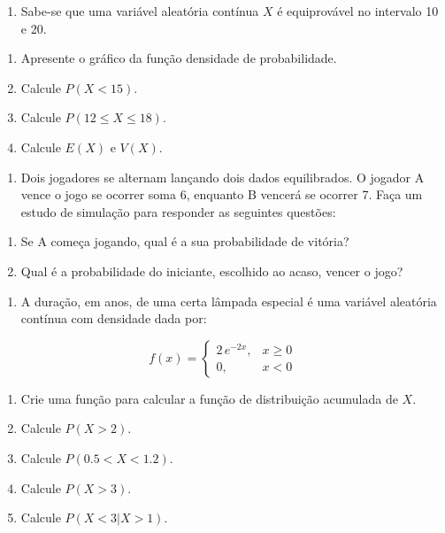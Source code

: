 \documentclass[
]{book}
\providecommand{\tightlist}{%
  \setlength{\itemsep}{0pt}\setlength{\parskip}{0pt}}
\begin{document}
\begin{enumerate}
\def\labelenumi{\arabic{enumi}.}
\setcounter{enumi}{1}
\tightlist
\item
  Sabe-se que uma variável aleatória contínua \(X\) é equiprovável no intervalo 10 e 20.
\end{enumerate}

\begin{enumerate}
\def\labelenumi{(\alph{enumi})}
\tightlist
\item
  Apresente o gráfico da função densidade de probabilidade.
\item
  Calcule \(P(X < 15)\).
\item
  Calcule \(P(12\leq X \leq 18)\).
\item
  Calcule \(E(X)\) e \(V(X)\).
\end{enumerate}

\begin{enumerate}
\def\labelenumi{\arabic{enumi}.}
\setcounter{enumi}{2}
\tightlist
\item
  Dois jogadores se alternam lançando dois dados equilibrados. O jogador A vence o jogo se ocorrer soma 6, enquanto B vencerá se ocorrer 7. Faça um estudo de simulação para responder as seguintes questões:
\end{enumerate}

\begin{enumerate}
\def\labelenumi{(\alph{enumi})}
\tightlist
\item
  Se A começa jogando, qual é a sua probabilidade de vitória?
\item
  Qual é a probabilidade do iniciante, escolhido ao acaso, vencer o jogo?
\end{enumerate}

\begin{enumerate}
\def\labelenumi{\arabic{enumi}.}
\setcounter{enumi}{3}
\tightlist
\item
  A duração, em anos, de uma certa lâmpada especial é uma variável aleatória contínua com densidade dada por:
\end{enumerate}

\[
f(x) = 
\begin{cases} 
2\,e^{-2x}, & x\geq0 \\[10pt]
0,& x<0
\end{cases}
\]

\begin{enumerate}
\def\labelenumi{(\alph{enumi})}
\item
  Crie uma função para calcular a função de distribuição acumulada de \(X\).
\item
  Calcule \(P(X>2)\).
\item
  Calcule \(P(0.5 < X <1.2)\).
\item
  Calcule \(P(X>3)\).
\item
  Calcule \(P(X<3 | X>1)\).
\end{enumerate}
\end{document}
